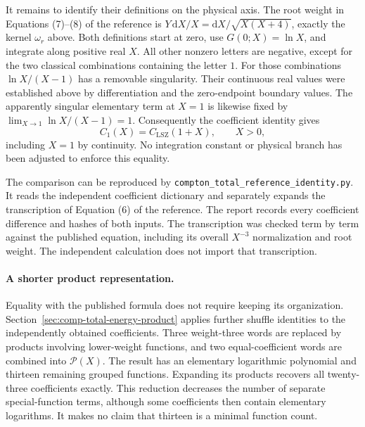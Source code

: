 It remains to identify their definitions on the physical axis.
The root weight in Equations (7)--(8) of the reference is
$Y\,\mathrm dX/X=\mathrm dX/\sqrt{X(X+4)}$, exactly the kernel
$\omega_{r}$ above. Both definitions start at zero, use
$G(0;X)=\ln X$, and integrate along positive real $X$.
All other nonzero letters are negative, except for the two classical
combinations containing the letter $1$.
For those combinations $\ln X/(X-1)$ has a removable singularity.
Their continuous real values were established above by differentiation
and the zero-endpoint boundary values.
The apparently singular elementary term at $X=1$ is likewise fixed by
$\lim_{X\to1}\ln X/(X-1)=1$.
Consequently the coefficient identity gives
\begin{equation}
 \boxed{C_1(X)=C_{\mathrm{LSZ}}(1+X),\qquad X>0,}
\end{equation}
including $X=1$ by continuity. No integration constant or physical
branch has been adjusted to enforce this equality.

The comparison can be reproduced by
\texttt{compton\_total\_reference\_identity.py}.
It reads the independent coefficient dictionary and separately expands
the transcription of Equation (6) of the reference.
The report records every coefficient difference and hashes of both
inputs. The transcription was checked term by term against the published
equation, including its overall $X^{-3}$ normalization and root weight.
The independent calculation does not import that transcription.

\paragraph{A shorter product representation.}
Equality with the published formula does not require keeping its
organization. Section~\ref{sec:comp-total-energy-product} applies further
shuffle identities to the independently obtained coefficients.
Three weight-three words are replaced by products involving lower-weight
functions, and two equal-coefficient words are combined into
$\mathcal P(X)$. The result has an elementary logarithmic polynomial
and thirteen remaining grouped functions. Expanding its products
recovers all twenty-three coefficients exactly.
This reduction decreases the number of separate special-function terms,
although some coefficients then contain elementary logarithms.
It makes no claim that thirteen is a minimal function count.
